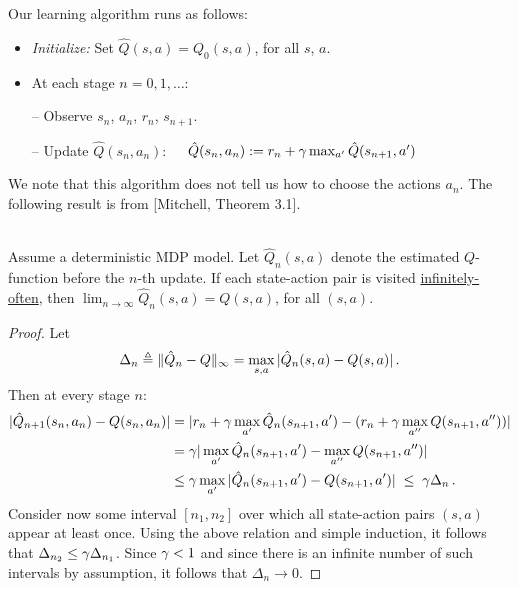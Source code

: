 Our learning algorithm runs as follows:
\begin{itemize}
\item {\em Initialize:} Set $\hat{Q}(s,a)= Q_0(s,a)$, for all $s$, $a$.
\item At each stage $n=0,1,\dots$:

-- Observe $s_n$, $a_n$, $r_n$, $s_{n+1}$.

-- Update $\hat{Q}(s_n,a_n)$:\ \ \
$\hat{Q}(s_n,a_n) := r_n+\gamma \max_{a'} \hat{Q}(s_{n+1},a')$
\end{itemize}

We note that this algorithm does not tell us how to choose the actions $a_n$.
The following result is from [Mitchell, Theorem 3.1].

\begin{theorem}\ \\
Assume a deterministic MDP model. Let $\hat{Q}_n(s,a)$ denote the estimated
$Q$-function before the $n$-th update.
If each state-action pair is visited \underline{infinitely-often}, then
$\lim_{n\to\infty}\hat{Q}_n(s,a)=Q(s,a)$, for all $(s,a)$.
\end{theorem}

\begin{proof}
Let
$$
\Delta_n \triangleq \|\hat{Q}_n-Q\|_\infty = \max_{s,a} |\hat{Q}_n(s,a)-Q(s,a) | \,.
$$
Then at every stage $n$:
\begin{align*}
| \hat{Q}_{n+1}(s_n,a_n)- Q(s_n,a_n)| &= |r_n+\gamma\max_{a'} \hat{Q}_n(s_{n+1},a')
- (r_n+\gamma\max_{a''} Q(s_{n+1},a'') ) | \\
&= \gamma |\max_{a'} \hat{Q}_n(s_{n+1},a') -\max_{a''} {Q}(s_{n+1},a'') | \\
& \le \gamma \max_{a'} |\hat{Q}_n(s_{n+1},a') - Q(s_{n+1},a') |
\; \le\;  \gamma \Delta_n \,.
\end{align*}
Consider now some interval $[n_1,n_2]$ over which all state-action pairs $(s,a)$
appear at least once. Using the above relation and simple induction, it
follows that $\Delta_{n_2} \le \gamma \Delta_{n_1}$. Since $\gamma<1$ and since
there is an infinite number of such intervals by assumption, it follows that
$\Delta_n \to 0$.
\end{proof}

